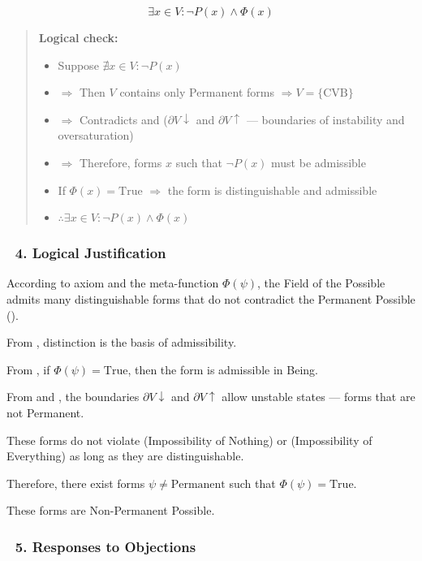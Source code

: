 \documentclass[12pt]{article}
\begin{document}
\[
\exists x \in V : \neg P(x) \wedge \Phi(x)
\]

\begin{quote}
\textbf{Logical check:}
\begin{itemize}
\item Suppose $\nexists x \in V : \neg P(x)$
\item $\Rightarrow$ Then $V$ contains only Permanent forms $\Rightarrow V = \{\mathrm{CVB}\}$
\item $\Rightarrow$ Contradicts \text{[4.2]} and \text{[4.3]} ($\partial V\downarrow$ and $\partial V\uparrow$ — boundaries of instability and oversaturation)
\item $\Rightarrow$ Therefore, forms $x$ such that $\neg P(x)$ must be admissible
\item If $\Phi(x) = \text{True}$ $\Rightarrow$ the form is distinguishable and admissible
\item $\therefore \exists x \in V : \neg P(x) \wedge \Phi(x)$
\end{itemize}
\end{quote}

\subsubsection*{🔹 4. Logical Justification}

According to axiom \text{[5]} and the meta-function $\Phi(\psi)$, the Field of the Possible admits many distinguishable forms that do not contradict the Permanent Possible (\text{[4.4]}).

From \text{[5]}, distinction is the basis of admissibility.

From \text{[11.1.1]}, if $\Phi(\psi) = \text{True}$, then the form is admissible in Being.

From \text{[4.2]} and \text{[4.3]}, the boundaries $\partial V\downarrow$ and $\partial V\uparrow$ allow unstable states — forms that are not Permanent.

These forms do not violate \text{[1]} (Impossibility of Nothing) or \text{[2]} (Impossibility of Everything) as long as they are distinguishable.

Therefore, there exist forms $\psi \neq \text{Permanent}$ such that $\Phi(\psi) = \text{True}$.

These forms are Non-Permanent Possible.

\subsubsection*{🔹 5. Responses to Objections}
\end{document}
